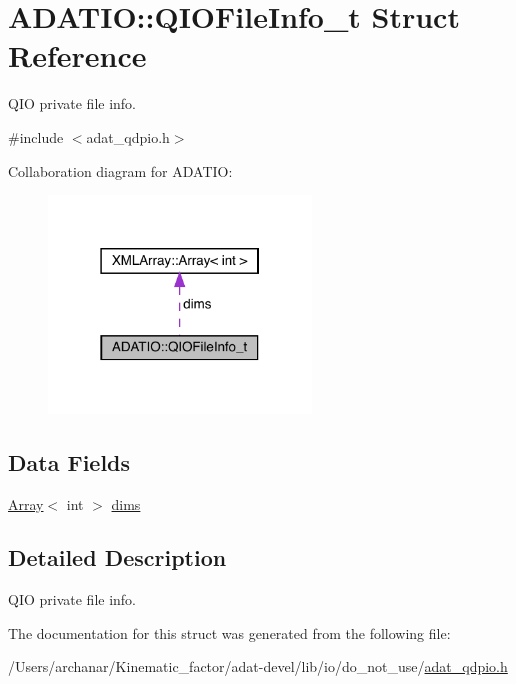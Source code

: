 \hypertarget{structADATIO_1_1QIOFileInfo__t}{}\section{A\+D\+A\+T\+IO\+:\+:Q\+I\+O\+File\+Info\+\_\+t Struct Reference}
\label{structADATIO_1_1QIOFileInfo__t}


Q\+IO private file info.  




{\ttfamily \#include $<$adat\+\_\+qdpio.\+h$>$}



Collaboration diagram for A\+D\+A\+T\+IO\+:\nopagebreak
\begin{figure}[H]
\begin{center}
\leavevmode
\includegraphics[width=198pt]{d0/d51/structADATIO_1_1QIOFileInfo__t__coll__graph}
\end{center}
\end{figure}
\subsection*{Data Fields}
\begin{DoxyCompactItemize}
\item 
\mbox{\hyperlink{classXMLArray_1_1Array}{Array}}$<$ int $>$ \mbox{\hyperlink{group__qio_ga5aa39f1711aa7f6ae4a7b8d73d7e3f97}{dims}}
\end{DoxyCompactItemize}


\subsection{Detailed Description}
Q\+IO private file info. 

The documentation for this struct was generated from the following file\+:\begin{DoxyCompactItemize}
\item 
/\+Users/archanar/\+Kinematic\+\_\+factor/adat-\/devel/lib/io/do\+\_\+not\+\_\+use/\mbox{\hyperlink{adat-devel_2lib_2io_2do__not__use_2adat__qdpio_8h}{adat\+\_\+qdpio.\+h}}\end{DoxyCompactItemize}
